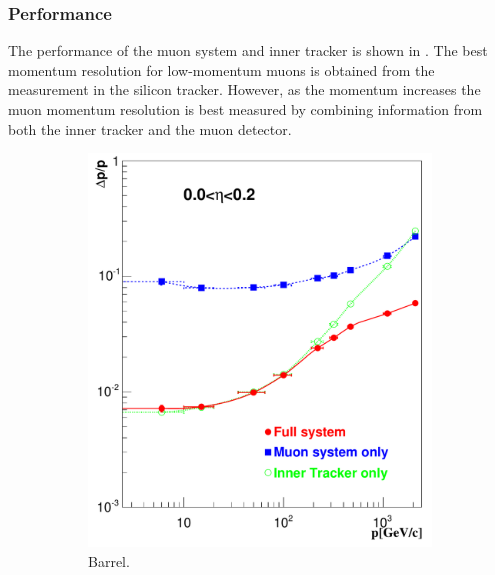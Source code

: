 \subsubsection{Performance}
The performance of the muon system and inner tracker is shown in 
. The best momentum resolution for low-momentum muons
is obtained from the measurement in the silicon tracker. However, as the momentum
increases the muon momentum resolution is best measured by combining information
from both the inner tracker and the muon detector.

\begin{figure}[htbp]
  \centering
  \begin{subfigure}{0.48\textwidth}
    \centering
    \includegraphics[width=\textwidth]{muon_barrel}
    \caption{Barrel.}
    \label{fig:muon_barrel}
  \end{subfigure}
  \begin{subfigure}{0.48\textwidth}
    \centering

\end{subfigure}
\end{figure}
